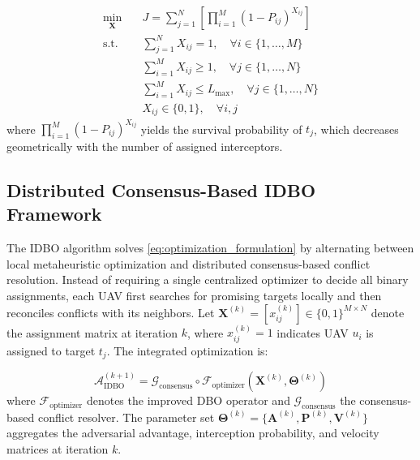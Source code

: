\documentclass[lettersize,journal]{IEEEtran}
\begin{document}
\begin{equation}
\label{eq:optimization_formulation}
\begin{aligned}
\min_{\mathbf{X}} \quad & J = \sum_{j=1}^{N} \left[ \prod_{i=1}^{M} \left(1 - P_{ij}\right)^{X_{ij}} \right] \\
\text{s.t.} \quad & \sum_{j=1}^{N} X_{ij} = 1, \quad \forall i \in \{1,\dots,M\} \\
& \sum_{i=1}^{M} X_{ij} \geq 1, \quad \forall j \in \{1,\dots,N\} \\
& \sum_{i=1}^{M} X_{ij} \leq L_{\max}, \quad \forall j \in \{1,\dots,N\} \\
& X_{ij} \in \{0,1\}, \quad \forall i,j
\end{aligned}
\end{equation}
where $\prod_{i=1}^{M} (1 - P_{ij})^{X_{ij}}$ yields the survival probability of $t_j$, which decreases geometrically with the number of assigned interceptors.

\subsection{Distributed Consensus-Based IDBO Framework}
\label{subsec:idbo_algorithm}

The IDBO algorithm solves \eqref{eq:optimization_formulation} by alternating between local metaheuristic optimization and distributed consensus-based conflict resolution. Instead of requiring a single centralized optimizer to decide all binary assignments, each UAV first searches for promising targets locally and then reconciles conflicts with its neighbors. Let $\mathbf{X}^{(k)} = [x_{ij}^{(k)}] \in \{0,1\}^{M \times N}$ denote the assignment matrix at iteration $k$, where $x_{ij}^{(k)}=1$ indicates UAV $u_i$ is assigned to target $t_j$. The integrated optimization is:

\begin{equation}
\label{eq:hierarchical}
\mathcal{A}_{\text{IDBO}}^{(k+1)} = \mathcal{G}_{\text{consensus}} \circ \mathcal{F}_{\text{optimizer}} \left( \mathbf{X}^{(k)}, \boldsymbol{\Theta}^{(k)} \right)
\end{equation}
where $\mathcal{F}_{\text{optimizer}}$ denotes the improved DBO operator and $\mathcal{G}_{\text{consensus}}$ the consensus-based conflict resolver. The parameter set $\boldsymbol{\Theta}^{(k)} = \{\mathbf{A}^{(k)}, \mathbf{P}^{(k)}, \mathbf{V}^{(k)}\}$ aggregates the adversarial advantage, interception probability, and velocity matrices at iteration $k$.
\end{document}
